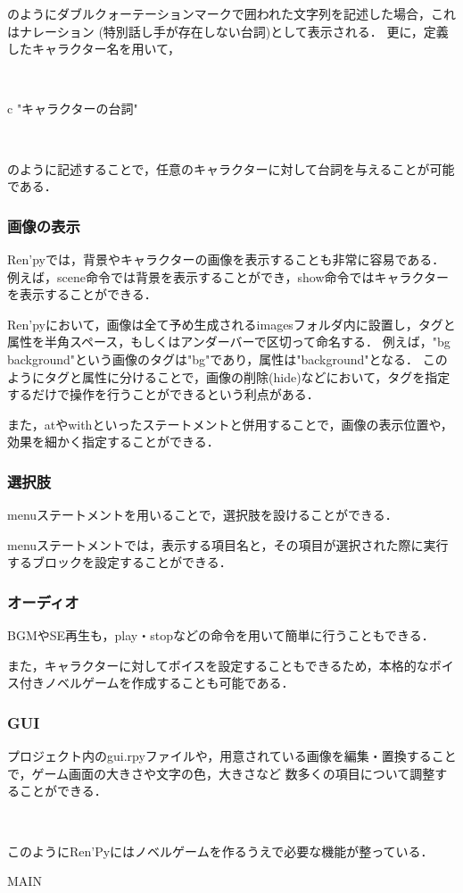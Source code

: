 \documentclass[a4paper]{jarticle}
\begin{document}
    のようにダブルクォーテーションマークで囲われた文字列を記述した場合，これはナレーション
    (特別話し手が存在しない台詞)として表示される．
    更に，定義したキャラクター名を用いて，

    ~

    c "キャラクターの台詞"

    ~

    のように記述することで，任意のキャラクターに対して台詞を与えることが可能である．

  \subsubsection{画像の表示}

    Ren'pyでは，背景やキャラクターの画像を表示することも非常に容易である．
    例えば，scene命令では背景を表示することができ，show命令ではキャラクターを表示することができる．

    Ren'pyにおいて，画像は全て予め生成されるimagesフォルダ内に設置し，タグと属性を半角スペース，もしくはアンダーバーで区切って命名する．
    例えば，"bg background"という画像のタグは"bg"であり，属性は"background"となる．
    このようにタグと属性に分けることで，画像の削除(hide)などにおいて，タグを指定するだけで操作を行うことができるという利点がある．

    また，atやwithといったステートメントと併用することで，画像の表示位置や，効果を細かく指定することができる．

  \subsubsection{選択肢}

    menuステートメントを用いることで，選択肢を設けることができる．
    
    menuステートメントでは，表示する項目名と，その項目が選択された際に実行するブロックを設定することができる．

  \subsubsection{オーディオ}

    BGMやSE再生も，play・stopなどの命令を用いて簡単に行うこともできる．

    また，キャラクターに対してボイスを設定することもできるため，本格的なボイス付きノベルゲームを作成することも可能である．

  \subsubsection{GUI}

    プロジェクト内のgui.rpyファイルや，用意されている画像を編集・置換することで，ゲーム画面の大きさや文字の色，大きさなど
    数多くの項目について調整することができる．

  ~

  このようにRen'Pyにはノベルゲームを作るうえで必要な機能が整っている．

\expandafter\ifx\csname MAIN \endcsname\relax
  
\end{document}

